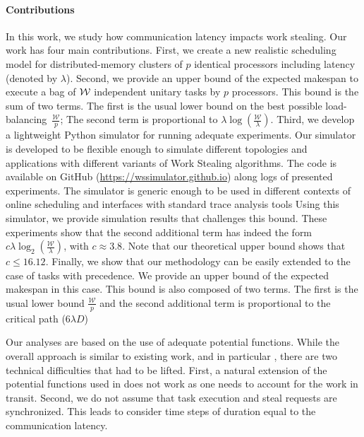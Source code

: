 \paragraph{Contributions}%
In this work, we study how communication latency impacts work
stealing.  Our work has four main contributions. First, we create a
new realistic scheduling model for distributed-memory clusters of $p$
identical processors including latency (denoted by $\lambda$).  Second,
we provide an upper bound of the expected makespan to execute a bag of
$\mathcal{W}$ independent unitary tasks by $p$ processors.  This bound is
the sum of two terms. The first is the usual lower bound on the best
possible load-balancing~$\frac{\mathcal{W}}{p}$; The second term is
proportional to $\lambda\log(\frac{\mathcal{W}}{\lambda})$.
Third, we develop a lightweight Python simulator for running adequate
experiments. Our simulator is developed to be flexible enough to
simulate different topologies and applications with different variants
of Work Stealing algorithms.
The code is available on GitHub (\url{https://wssimulator.github.io})
along logs of presented experiments. The simulator is
generic enough to be used in different contexts of online
scheduling and interfaces with standard trace analysis
tools
Using this simulator,
we provide simulation results that challenges this bound.
These experiments show that the second additional term has indeed the
form $c\lambda\log_2(\frac{\mathcal{W}}{\lambda})$, with
$c\approx3.8$. Note that our theoretical upper bound shows that
$c\le16.12$.  Finally, we show that our methodology can be easily
extended to the case of tasks with precedence. We provide an upper
bound of the expected makespan in this case. This bound is also
composed of two terms. The first is the usual lower bound
$\frac{\mathcal{W}}{p}$ and the second additional term is proportional to the
critical path ($6\lambda D$)

Our analyses are based on the use of adequate potential
functions. While the overall approach is similar to existing work, and in
particular \cite{Denis2013}, there are two technical difficulties that
had to be lifted.  First, a natural extension of the potential
functions used in \cite{Denis2013} does not work as one needs to
account for the work in transit. Second, we do not assume that task
execution and steal requests are synchronized.  This leads to consider
time steps of duration equal to the communication latency.

